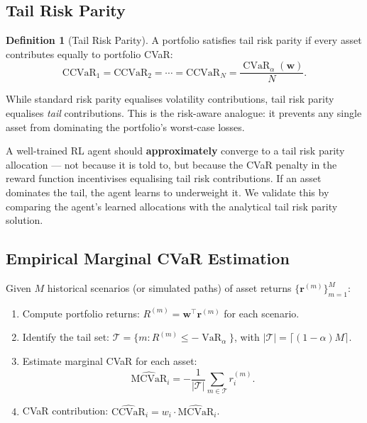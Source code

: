 \documentclass[11pt, a4paper]{article}
\theoremstyle{definition}
\newtheorem{definition}{Definition}[section]
\theoremstyle{plain}
\theoremstyle{remark}
\newcommand{\VaR}{\operatorname{VaR}}
\newcommand{\CVaR}{\operatorname{CVaR}}
\begin{document}
\subsection{Tail Risk Parity}

\begin{definition}[Tail Risk Parity]
\label{def:tail_risk_parity}
A portfolio satisfies tail risk parity if every asset contributes
equally to portfolio CVaR:
\begin{equation}
    \text{CCVaR}_1 = \text{CCVaR}_2 = \cdots = \text{CCVaR}_N
    = \frac{\CVaR_\alpha(\bm{w})}{N}.
    \label{eq:tail_parity}
\end{equation}
\end{definition}

While standard risk parity equalises volatility contributions, tail
risk parity equalises \emph{tail} contributions. This is the risk-aware
analogue: it prevents any single asset from dominating the portfolio's
worst-case losses.

\begin{keyidea}
A well-trained RL agent should \textbf{approximately} converge to a tail
risk parity allocation --- not because it is told to, but because the CVaR
penalty in the reward function incentivises equalising tail risk
contributions. If an asset dominates the tail, the agent learns to
underweight it. We validate this by comparing the agent's learned
allocations with the analytical tail risk parity solution.
\end{keyidea}

\subsection{Empirical Marginal CVaR Estimation}

Given $M$ historical scenarios (or simulated paths) of asset returns
$\{\bm{r}^{(m)}\}_{m=1}^M$:
\begin{enumerate}[leftmargin=2em]
    \item Compute portfolio returns:
          $R^{(m)} = \bm{w}^\top \bm{r}^{(m)}$ for each scenario.
    \item Identify the tail set:
          $\mathcal{T} = \{m : R^{(m)} \leq -\VaR_\alpha\}$,
          with $|\mathcal{T}| = \lceil(1-\alpha)M\rceil$.
    \item Estimate marginal CVaR for each asset:
          \[
              \widehat{\text{MCVaR}}_i
              = -\frac{1}{|\mathcal{T}|}
              \sum_{m \in \mathcal{T}} r_i^{(m)}.
          \]
    \item CVaR contribution:
          $\widehat{\text{CCVaR}}_i = w_i \cdot \widehat{\text{MCVaR}}_i$.
\end{enumerate}
\end{document}
